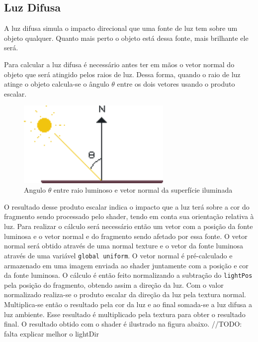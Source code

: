 \documentclass[12pt, 
openright, 
oneside, 
a4paper,    
brazil]{facom-ufu-abntex2}
\begin{document}
\subsection{Luz Difusa}
A luz difusa simula o impacto direcional que uma fonte de luz tem sobre um objeto qualquer. Quanto mais perto o objeto está dessa fonte, mais brilhante ele será.

Para calcular a luz difusa é necessário antes ter em mãos o vetor normal do objeto que será atingido pelos raios de luz. Dessa forma, quando o raio de luz atinge o objeto calcula-se o ângulo $\theta$ entre os dois vetores usando o produto escalar.

\begin{figure}[H]
	\centering
	\includegraphics[width=20em]{imagens/normal_reflection.png}
	\caption{Angulo $\theta$ entre raio luminoso e vetor normal da superfície iluminada}
\end{figure}

O resultado desse produto escalar indica o impacto que a luz terá sobre a cor do fragmento sendo processado pelo shader, tendo em conta sua orientação relativa à luz. Para realizar o cálculo será necessário  então um vetor com a posição da fonte luminosa e o vetor normal e do fragmento sendo afetado por essa fonte.
O vetor normal será obtido através de uma normal texture e o vetor da fonte luminosa através de uma variável \texttt{global uniform}. O vetor normal é pré-calculado e armazenado em uma imagem enviada ao shader juntamente com a posição e cor da fonte luminosa. O cálculo é então feito normalizando a subtração do \texttt{lightPos} pela posição do fragmento, obtendo assim a direção da luz. Com o valor normalizado realiza-se o produto escalar da direção da luz pela textura normal. Multiplica-se então o resultado pela cor da luz e ao final somada-se a luz difusa a luz ambiente. Esse resultado é multiplicado pela textura para obter o resultado final. O resultado obtido com o shader é ilustrado na figura abaixo.
//TODO: falta explicar melhor o lightDir
\end{document}
